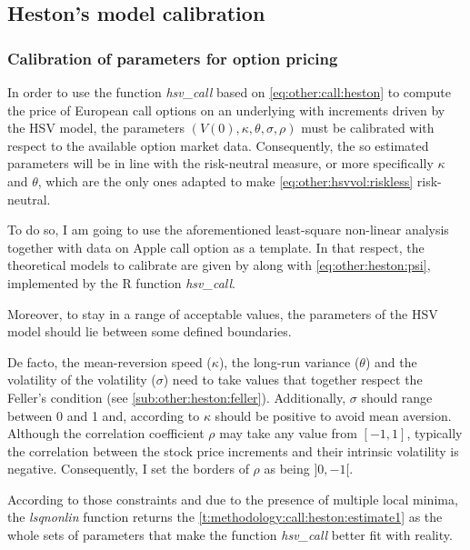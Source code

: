 \documentclass[12pt]{report}
\begin{document}

\subsection{Heston's model calibration}
\label{sub:methodology:calibration:heston}

\subsubsection*{Calibration of parameters for option pricing}

In order to use the function \textit{hsv\_call} based on \cref{eq:other:call:heston} to compute the price of European call options on an underlying with increments driven by the HSV model, the parameters $(V(0), \kappa, \theta, \sigma, \rho)$ must be calibrated with respect to the available option market data.
Consequently, the so estimated parameters will be in line with the risk-neutral measure, or more specifically $\kappa$ and $\theta$, which are the only ones adapted to make \cref{eq:other:hsvvol:riskless} risk-neutral.

To do so, I am going to use the aforementioned least-square non-linear analysis together with data on Apple call option as a template.
In that respect, the theoretical models to calibrate are given by  along with \cref{eq:other:heston:psi}, implemented by the R function \textit{hsv\_call}.

Moreover, to stay in a range of acceptable values, the parameters of the HSV model should lie between some defined boundaries. 

De facto, the mean-reversion speed ($\kappa$), the long-run variance ($\theta$) and the volatility of the volatility ($\sigma$) need to take values that together respect the Feller's condition (see \cref{sub:other:heston:feller}). 
Additionally, $\sigma$ should range between 0 and 1 and, according to \citet{cristo2015} $\kappa$ should be positive to avoid mean aversion.
Although the correlation coefficient $\rho$ may take any value from $[-1, 1]$, typically the correlation between the stock price increments and their intrinsic volatility is negative. Consequently, I set the borders of $\rho$ as being $]0, -1[$.

According to those constraints and due to the presence of multiple local minima, the \textit{lsqnonlin} function returns the \cref{t:methodology:call:heston:estimate1} as the whole sets of parameters that make the function \textit{hsv\_call} better fit with reality.
\end{document}
